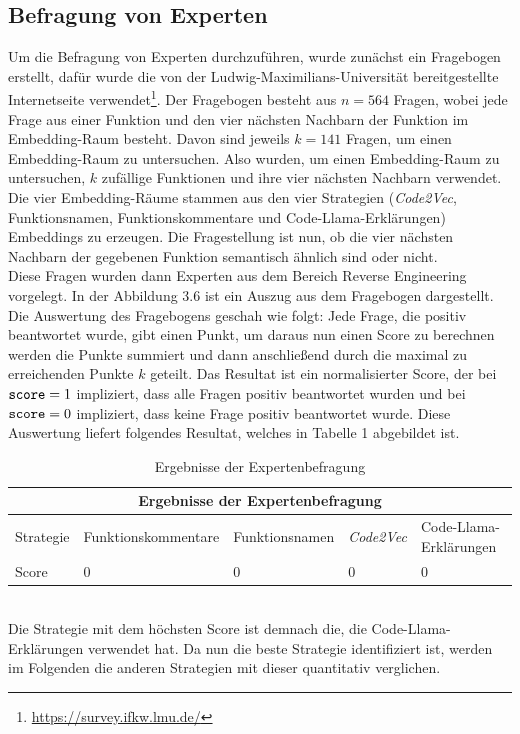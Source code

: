 \documentclass[12pt,letterpaper,ngerman]{article}
\begin{document}
\subsection{Befragung von Experten}
Um die Befragung von Experten durchzuführen, wurde zunächst ein
Fragebogen erstellt, dafür wurde die von der 
Ludwig-Maximilians-Universität bereitgestellte Internetseite
verwendet\footnote{\url{https://survey.ifkw.lmu.de/}}. Der 
Fragebogen besteht aus $n=564 $ Fragen, wobei jede Frage aus
einer Funktion und den vier nächsten Nachbarn der Funktion im
Embedding-Raum besteht. Davon sind jeweils $k = 141$ Fragen, um
einen Embedding-Raum zu untersuchen. Also wurden, um einen
Embedding-Raum zu untersuchen, $k$ zufällige Funktionen und ihre
vier nächsten Nachbarn verwendet. Die vier Embedding-Räume
stammen aus den vier Strategien (\textit{Code2Vec}, Funktionsnamen,
Funktionskommentare und Code-Llama-Erklärungen) Embeddings zu 
erzeugen. Die Fragestellung ist nun, ob die vier nächsten Nachbarn 
der gegebenen Funktion semantisch ähnlich sind oder nicht.\\
Diese Fragen wurden dann Experten aus dem Bereich Reverse Engineering
vorgelegt. In der Abbildung 3.6 ist ein Auszug aus dem Fragebogen dargestellt.\\
Die Auswertung des Fragebogens geschah wie folgt: Jede Frage,
die positiv beantwortet wurde, gibt einen Punkt, um daraus nun 
einen Score zu berechnen werden die Punkte
summiert und dann anschließend durch die  maximal zu
erreichenden Punkte $k$ geteilt. Das Resultat ist ein normalisierter 
Score, der bei $\verb|score| = 1$ impliziert, dass alle Fragen 
positiv beantwortet wurden und bei $\verb|score| = 0$ impliziert, 
dass keine Frage positiv beantwortet wurde. Diese 
Auswertung liefert folgendes Resultat, welches in Tabelle 1
abgebildet ist.
\begin{table}
  \begin{center}
    \begin{tabular}{ |p{1.3cm}||p{3.8cm}|p{3cm}|p{1.8cm}|p{4.5cm}|  }
    \hline
    \multicolumn{5}{|c|}{Ergebnisse der Expertenbefragung} \\
    \hline
    Strategie & Funktionskommentare &  Funktionsnamen & \textit{Code2Vec} & Code-Llama-Erklärungen\\
    \hline
    Score   &  0                    &        0        &   0               & 0\\
    \hline
    \end{tabular}
  \end{center} 
  \caption{Ergebnisse der Expertenbefragung}
\end{table}
\hfill\\
Die Strategie mit dem höchsten Score ist demnach die, die Code-Llama-Erklärungen
verwendet hat. Da nun die beste Strategie identifiziert ist, 
werden im Folgenden die anderen Strategien mit dieser quantitativ verglichen.
\pagebreak
\end{document}
